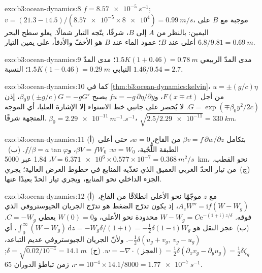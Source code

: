 \begin{solution}{exo:b3:ocean-dynamics:8}
$f = \qty{8.57e-5}{s^{-1}}$; $v = (21.3 - 14.5)/(\num{8.57e-5}\times\num{8e4})
= \qty{0.99}{m/s}$، موجبة مع $B$ على اليمين: بالنظر من $A$ إلى $B$،
شرقًا، يتّجه التيار شمالًا. يعلو سطح البحر
$6.8/9.81 = \qty{0.69}{m}$ أعلى عند $B$؛ عمود الماء عند $B$ هو
الأخفّ والأدفأ، على يمين التيار.
\end{solution}

\begin{solution}{exo:b3:ocean-dynamics:9}
مدى المدّ الربيعي $1.5K(1 + 0.46) = \qty{0.78}{m}$؛ مدى المدّ النيابي $1.5K(1 - 0.46)
= \qty{0.29}{m}$؛ النسبة $1.46/0.54 = 2.7$.
\end{solution}

\begin{solution}{exo:b3:ocean-dynamics:10}
كما في \cref{thm:b3:ocean-dynamics:kelvin}، $u = \pm(g/c)\eta$ من أجل $F(x \mp
ct)$، و$fu = -g\,\partial\eta/\partial y$ يصبح $\beta_0y(\pm g/c)G =
-gG'$، إذن $G = \exp(\mp\beta_0y^2/2c)$. لا يُحصر على جانبي خط الاستواء
إلا الإشارة العليا، أي الموجة المتجهة شرقًا. $\beta_0 =
\qty{2.29e-11}{m^{-1}.s^{-1}}$، $\sqrt{2.5/\num{2.29e-11}} = \qty{330}{km}$.
\end{solution}

\begin{solution}{exo:b3:ocean-dynamics:11}
(أ)~بتكامل $\beta v = f\,\partial w/\partial z$ من القاع، $w = 0$،
حتى أعلى الطبقة اللُّجّية، $w = W_0$: $\beta V = fW_0$، و$f/\beta =
a\tan\varphi$. (ب)~$V = \num{6.371e6}\times0.577\times10^{-7} =
\qty{0.368}{m^2/s}$، \qty{1.84}{\sverdrup} عبر \qty{5000}{km}، نحو القطب.
(ج)~من تيار الحدّ الغربي العميق الذي تغذّيه المنابع في خطوط العرض العالية؛
يجري الجزء الداخلي نحو المنابع، ويجري تيار الحدّ بعيدًا
عنها.
\end{solution}

\begin{solution}{exo:b3:ocean-dynamics:12}
(أ)~مع $z$ موجّهًا نحو الأعلى انطلاقًا من القاع، $A_zW'' = \mathrm if(W - W_g)$، إذ
يكون تدرّج الضغط هو تدرّج الجريان الجيوستروفي الذي فوقه. $W - W_g =
C\mathrm e^{-(1+\mathrm i)z/\delta}$ محدودة نحو الأعلى، و$W(0) = 0$ يعطي
$C = -W_g$. (ب)~عجز النقل هو $\int_0^\infty(W - W_g)\,\mathrm dz
= -W_g\delta/(1+\mathrm i) = -\tfrac12\delta(1 - \mathrm i)W_g$، أي
$-\tfrac12\delta(u_g + v_g,\ v_g - u_g)$. ولأنّ الجريان الجيوستروفي عديم
التباعد، $w = -\nabla\cdot(\text{العجز}) = \tfrac12\delta(\partial_x
v_g - \partial_y u_g) = \tfrac12\delta\zeta_g$. (ج)~$\delta =
\sqrt{0.02/10^{-4}} = \qty{14.1}{m}$; $r = 10^{-4}\times14.1/8000 =
\qty{1.77e-7}{s^{-1}}$، زمن تباطؤ الدوران \num{65}.
\end{solution}

